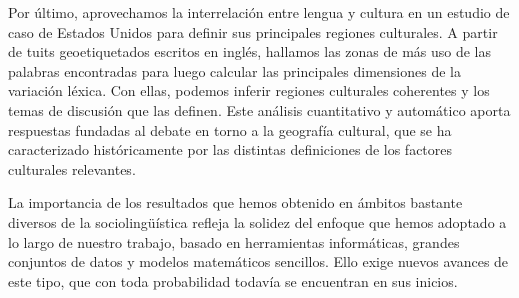 \documentclass[../thesis.tex]{subfiles}
\begin{document}
\begin{es}
Por último, aprovechamos la interrelación entre lengua y cultura en un estudio de caso
de Estados Unidos para definir sus principales regiones culturales. A partir de tuits
geoetiquetados escritos en inglés, hallamos las zonas de más uso de las palabras
encontradas para luego calcular las principales dimensiones de la variación
léxica. Con ellas, podemos inferir regiones culturales coherentes y los temas de discusión que las
definen. Este análisis cuantitativo y automático aporta respuestas fundadas al debate en
torno a la geografía cultural, que se ha caracterizado históricamente por las distintas
definiciones de los factores culturales relevantes.

La importancia de los resultados que hemos obtenido en ámbitos bastante diversos de la
sociolingüística refleja la solidez del enfoque que hemos adoptado a lo largo de nuestro
trabajo, basado en herramientas informáticas, grandes conjuntos de datos y modelos
matemáticos sencillos. Ello exige nuevos avances de este tipo, que con toda probabilidad
todavía se encuentran en sus inicios.
\end{es}



\clearpage
\end{document}
